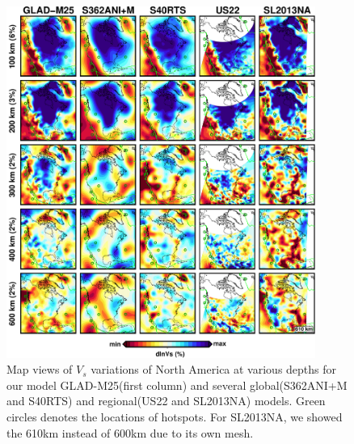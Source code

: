 \documentclass[extra,mreferee]{gji}
\begin{document}
\begin{figure}
\centering
\includegraphics[width=0.9\textwidth]{figures/depth_slice/america_vs.pdf}
  \caption{Map views of $V_s$ variations of North America at various depths for our model GLAD-M25(first column) and several global(S362ANI+M and S40RTS) and regional(US22\citep{zhu2017radial} and SL2013NA\citep{schaeffer2014imaging}) models. Green circles denotes the locations of hotspots. For SL2013NA, we showed the 610km instead of 600km due to its own mesh.}
\label{fig:america-vs}

\end{figure}
\end{document}
